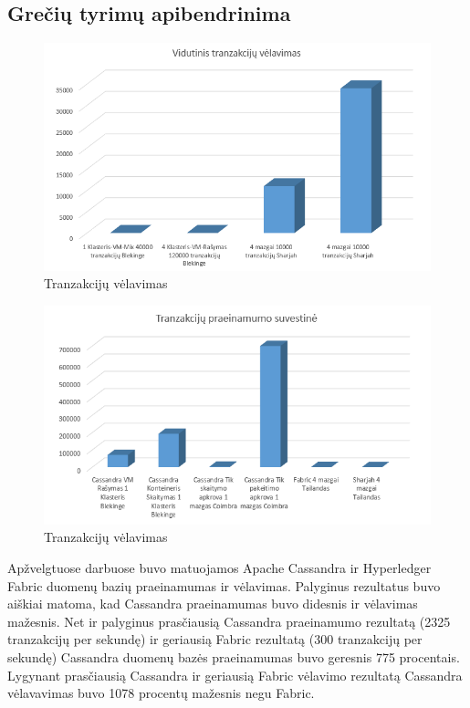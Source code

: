 \documentclass{VUMIFPSkursinis}
\begin{document}
	\subsection{Grečių tyrimų apibendrinima}
		\begin{figure}[H]
		    \centering
		    \includegraphics[scale=0.5]{img/CasHypLat}
		    \caption{Tranzakcijų vėlavimas}   %
		    \label{img:mlp}
		\end{figure}
		\begin{figure}[H]
		    \centering
		    \includegraphics[scale=0.5]{img/CasHypTp}
		    \caption{Tranzakcijų vėlavimas}   %
		    \label{img:mlp}
		\end{figure}

		Apžvelgtuose darbuose buvo matuojamos Apache Cassandra ir Hyperledger Fabric duomenų bazių praeinamumas ir vėlavimas.
		Palyginus rezultatus buvo aiškiai matoma, kad Cassandra praeinamumas buvo didesnis ir vėlavimas mažesnis. 
		Net ir palyginus prasčiausią Cassandra praeinamumo rezultatą (2325 tranzakcijų per sekundę) ir geriausią Fabric rezultatą (300 tranzakcijų per sekundę) Cassandra duomenų bazės 				praeinamumas buvo geresnis 775 procentais. Lygynant prasčiausią Cassandra ir geriausią Fabric vėlavimo rezultatą Cassandra vėlavavimas buvo 1078 procentų mažesnis negu 				Fabric.
\pagebreak
\end{document}
